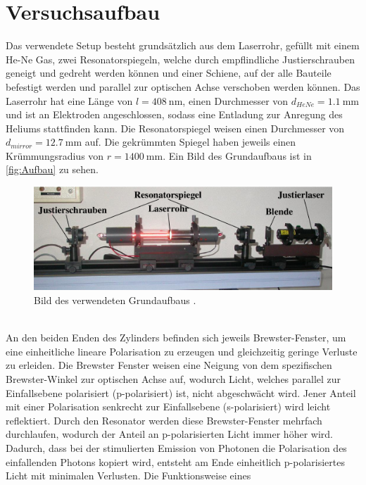 \chapter{Versuchsaufbau}
\label{cha:Versuchsaufbau}

Das verwendete Setup besteht grundsätzlich aus dem Laserrohr, gefüllt mit einem He-Ne Gas, zwei Resonatorspiegeln, welche durch empflindliche Justierschrauben geneigt und gedreht werden können und 
einer Schiene, auf der alle Bauteile befestigt werden und parallel zur optischen Achse verschoben werden können. Das Laserrohr hat eine Länge von $l=\qty{408}{\nano\metre}$, einen Durchmesser
von $d_{HeNe} = \qty{1.1}{\milli\metre}$ und ist an Elektroden angeschlossen, sodass eine Entladung zur Anregung des Heliums stattfinden kann. Die Resonatorspiegel weisen einen Durchmesser von $d_{mirror} = \qty{12.7}{\milli\metre}$
auf. Die gekrümmten Spiegel haben jeweils einen Krümmungsradius von $r = \qty{1400}{\milli\metre}$.
Ein Bild des Grundaufbaus ist in \autoref{fig:Aufbau} zu sehen.
\begin{figure}
    \centering
    \includegraphics[width = \textwidth]{v61_bilder/Aufbau.png}
    \caption{Bild des verwendeten Grundaufbaus \cite{v61}.}
    \label{fig:Aufbau}
\end{figure}
\\An den beiden Enden des Zylinders befinden sich jeweils Brewster-Fenster, um eine einheitliche lineare Polarisation zu erzeugen und gleichzeitig geringe Verluste zu erleiden. Die Brewster Fenster
weisen eine Neigung von dem spezifischen Brewster-Winkel zur optischen Achse auf, wodurch Licht, welches parallel zur Einfallsebene polarisiert (p-polarisiert) ist, nicht abgeschwächt wird. Jener Anteil mit einer Polarisation
senkrecht zur Einfallsebene (s-polarisiert) wird leicht reflektiert. Durch den Resonator werden diese Brewster-Fenster mehrfach durchlaufen, wodurch der Anteil an p-polarisierten Licht immer höher wird.
Dadurch, dass bei der stimulierten Emission von Photonen die Polarisation des einfallenden Photons kopiert wird, entsteht am Ende einheitlich p-polarisiertes Licht mit minimalen Verlusten. Die Funktionsweise eines
